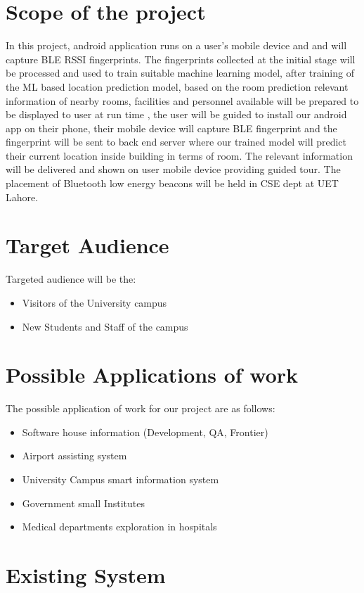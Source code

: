 \documentclass{article}
\begin{document}
\section{Scope of the project}
In this project, android application runs on a user’s mobile device and and will capture BLE RSSI fingerprints. The fingerprints collected at the initial stage will be processed and used to train suitable machine learning model, after training of the ML based location prediction model, based on the room prediction relevant information of nearby rooms, facilities and personnel available will be prepared to be displayed to user at run time , the user will be guided to install our android app on their phone, their mobile device will capture BLE fingerprint and the fingerprint will be sent to back end server where our trained model will predict their current location inside building in terms of room\cite{Loco}. The relevant information will be delivered and shown on user mobile device providing guided tour. 
The placement of Bluetooth low energy beacons will be held in CSE dept at UET Lahore. 


\section{Target Audience}
Targeted audience will be the:
\begin{itemize}
\item Visitors of the University campus 
\item New Students and Staff of the campus
\end{itemize}



\section{Possible Applications of work}
The possible application of work for our project are as follows:


\begin{itemize}
\item Software house information (Development, QA, Frontier)
\item Airport assisting system
\item University Campus smart information system
\item Government small Institutes
\item Medical departments exploration in hospitals
\end{itemize}

\section{Existing System}
\end{document}
